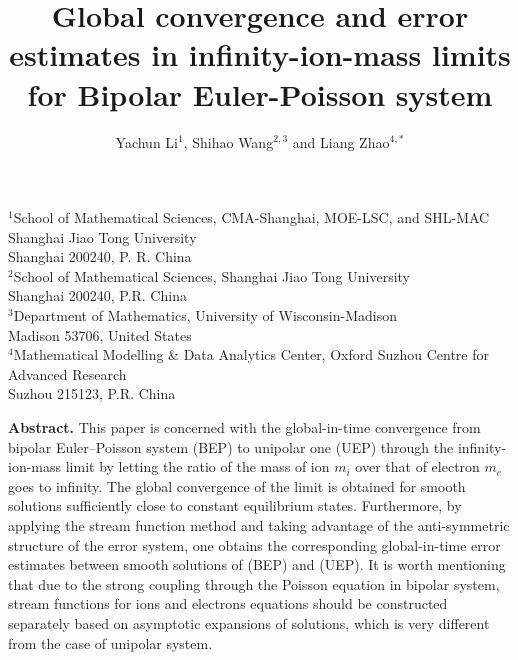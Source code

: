 \documentclass[reqno,twoside,12pt,a4paper]{amsart}
\numberwithin{equation}{section}
\begin{document}
	\title{\bf Global convergence and error estimates in infinity-ion-mass limits for Bipolar Euler-Poisson system}
	
	\author{Yachun Li$^{1}$, Shihao Wang$^{2,3}$ and Liang Zhao$^{4,*}$}
	\date{}
	\maketitle {}
	
	\vspace{-3mm}
	
	\begin{center}
		{\small 
			$^1$School of Mathematical Sciences, CMA-Shanghai, MOE-LSC, and SHL-MAC  \\Shanghai Jiao Tong University
\\Shanghai 200240, P. R. China
\\[2mm]			
	$^2$School of Mathematical Sciences, Shanghai Jiao Tong University\\
			Shanghai 200240, P.R. China\\[2mm]
			$^3$Department of Mathematics, University of Wisconsin-Madison\\
			Madison 53706, United States\\[2mm]
			$^4$Mathematical Modelling \& Data Analytics Center,
			Oxford Suzhou Centre for Advanced Research\\
			Suzhou 215123, P.R. China
		
		}
	\end{center}
	
	
	
	\vspace{1cm}
	
	\begin{center}
		\begin{minipage}{15cm}
			\small
			{\bf Abstract.} This paper is concerned with the global-in-time convergence from bipolar Euler–Poisson system (BEP) to unipolar one (UEP) through the infinity-ion-mass limit by letting the ratio of the mass of ion $m_i$ over that of electron $m_e$ goes to infinity. 
			The global convergence of the limit is obtained for smooth solutions sufficiently close to constant equilibrium states. Furthermore, by applying the stream function method and taking advantage of the anti-symmetric structure of the error system, one obtains the corresponding global-in-time error estimates between smooth solutions of (BEP) and (UEP). It is worth mentioning that due to the strong coupling through the Poisson equation in bipolar system, stream functions for ions and electrons equations should be constructed separately based on asymptotic expansions of solutions, which is very different from the case of unipolar system. 
		\end{minipage}
	\end{center}
	
\end{document}
